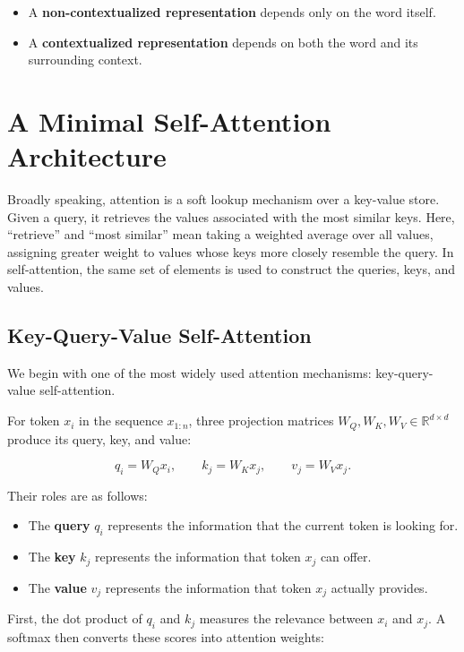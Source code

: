 \documentclass[
  a4paper,
  10pt]{article}
\providecommand{\tightlist}{%
  \setlength{\itemsep}{0pt}\setlength{\parskip}{0pt}}
\begin{document}
\begin{itemize}
\tightlist
\item
  A \textbf{non-contextualized representation} depends only on the word
  itself.
\item
  A \textbf{contextualized representation} depends on both the word and
  its surrounding context.
\end{itemize}

\section{A Minimal Self-Attention
Architecture}\label{a-minimal-self-attention-architecture}

Broadly speaking, attention is a soft lookup mechanism over a key-value
store. Given a query, it retrieves the values associated with the most
similar keys. Here, ``retrieve'' and ``most similar'' mean taking a
weighted average over all values, assigning greater weight to values
whose keys more closely resemble the query. In self-attention, the same
set of elements is used to construct the queries, keys, and values.

\subsection{Key-Query-Value
Self-Attention}\label{key-query-value-self-attention}

We begin with one of the most widely used attention mechanisms:
key-query-value self-attention.

For token \(x_i\) in the sequence \(x_{1:n}\), three projection matrices
\(W_Q,W_K,W_V\in\mathbb{R}^{d\times d}\) produce its query, key, and
value:

\[
q_i=W_Qx_i,
\qquad
k_j=W_Kx_j,
\qquad
v_j=W_Vx_j.
\]

Their roles are as follows:

\begin{itemize}
\tightlist
\item
  The \textbf{query} \(q_i\) represents the information that the current
  token is looking for.
\item
  The \textbf{key} \(k_j\) represents the information that token \(x_j\)
  can offer.
\item
  The \textbf{value} \(v_j\) represents the information that token
  \(x_j\) actually provides.
\end{itemize}

First, the dot product of \(q_i\) and \(k_j\) measures the relevance
between \(x_i\) and \(x_j\). A softmax then converts these scores into
attention weights:
\end{document}
